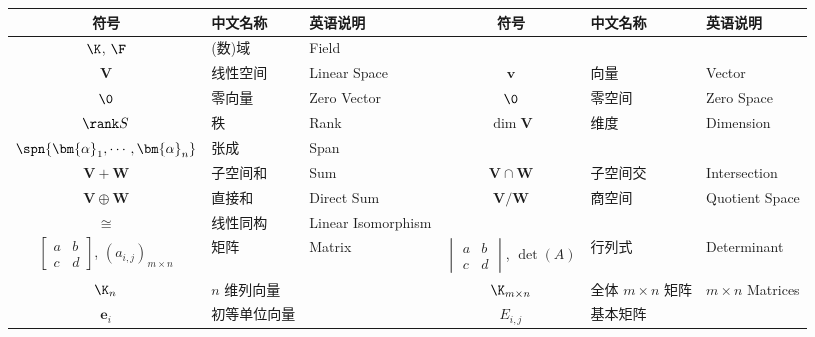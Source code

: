\documentclass[UTF8]{ctexart}
\begin{document}
            \begin{center}
                \scriptsize
                \begin{tabular}{|c|l|l||c|l|l|}
                    \hline
                    符号 & 中文名称 & 英语说明 & 符号 & 中文名称 & 英语说明\\
                    \hline\hline
                    $\K$, $\F$ & (数)域 & Field\\
                    \hline
                    $\mathbf{V}$ & 线性空间 & Linear Space & $\bm{v}$ & 向量 & Vector\\
                    \hline
                    $\0$ & 零向量 & Zero Vector & $\0$ & 零空间 & Zero Space\\
                    \hline
                    $\rank S$ & 秩 & Rank & $\dim\mathbf{V}$ & 维度 & Dimension\\
                    \hline
                    $\spn\{\bm{\alpha}_1,\cdots,\bm{\alpha}_n\}$ & 张成 & Span &\\
                    \hline
                    $\mathbf{V}+\mathbf{W}$ & 子空间和 & Sum & $\mathbf{V}\cap\mathbf{W}$ & 子空间交 & Intersection\\
                    \hline
                    $\mathbf{V}\oplus\mathbf{W}$ & 直接和 & Direct Sum & $\mathbf{V}/\mathbf{W}$ & 商空间 & Quotient Space\\
                    \hline
                    $\cong$ & 线性同构 & Linear Isomorphism &\\
                    \hline
                    $
                    \begin{bmatrix}
                        a & b\\
                        c & d
                    \end{bmatrix}$, $(a_{i,j})_{m\times n}$ & 矩阵 & Matrix & 
                    $
                    \begin{vmatrix}
                        a & b\\
                        c & d
                    \end{vmatrix}$, $\det(A)$ & 行列式 & Determinant\\
                    \hline
                    $\K_n$ & $n$ 维列向量 & & $\K_{m\times n}$ & 全体 $m\times n$ 矩阵 & $m\times n$ Matrices\\
                    \hline
                    $\bm{e}_i$ & 初等单位向量 & & $E_{i,j}$ & 基本矩阵 &\\
                    \hline

\end{tabular}
\end{center}
\end{document}

